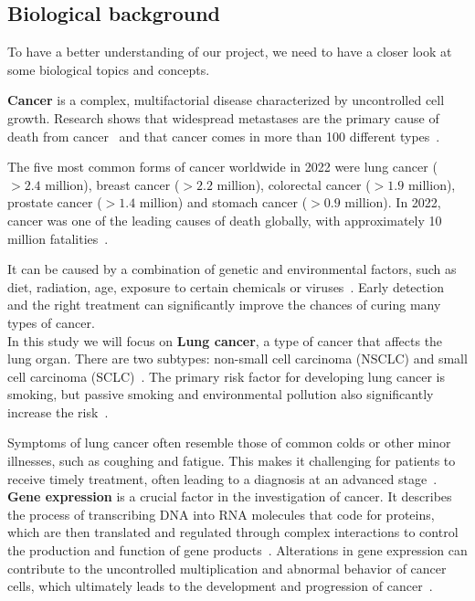 \subsection{Biological background} \label{subsec:biological_background}
To have a better understanding of our project, we need to have a closer look at some biological topics and concepts.

\textbf{Cancer} is a complex, multifactorial disease characterized by uncontrolled cell growth.
Research shows that widespread metastases are the primary cause of death from cancer~\cite{who_cancer_fact_sheet}
and that cancer comes in more than 100 different types~\cite{nci_cancer_types}.

The five most common forms of cancer worldwide in 2022 were lung cancer ($>2.4$ million),
breast cancer ($>2.2$ million), colorectal cancer ($>1.9$ million), prostate cancer ($>1.4$ million) and
stomach cancer ($>0.9$ million).
In 2022, cancer was one of the leading causes of death globally,
with approximately 10 million fatalities~\cite{ferlay2024global}.

It can be caused by a combination of genetic and environmental factors,
such as diet, radiation, age, exposure to certain chemicals or viruses~\cite{nci_cancer_risk}.
Early detection and the right treatment can significantly improve the chances of curing many types of cancer.
\\

In this study we will focus on \textbf{Lung cancer}, a type of cancer that affects the lung organ.
There are two subtypes: non-small cell carcinoma (NSCLC) and small cell carcinoma (SCLC)~\cite{nci_lung_cancer_types}.
The primary risk factor for developing lung cancer is smoking,
but passive smoking and environmental pollution also significantly increase the risk~\cite{nci_lung_cancer_types}.

Symptoms of lung cancer often resemble those of common colds or other minor illnesses, such as coughing and fatigue.
This makes it challenging for patients to receive timely treatment, often leading to a diagnosis at an advanced stage~\cite{who_lung_cancer}.
\\

\textbf{Gene expression} is a crucial factor in the investigation of cancer.
It describes the process of transcribing DNA into RNA molecules that code for proteins,
which are then translated and regulated through complex interactions to control the production
and function of gene products~\cite{nhi_gene_expression}.
Alterations in gene expression can contribute to the uncontrolled multiplication and abnormal behavior of cancer cells,
which ultimately leads to the development and progression of cancer~\cite{ferlier2022regulation}.
\\

